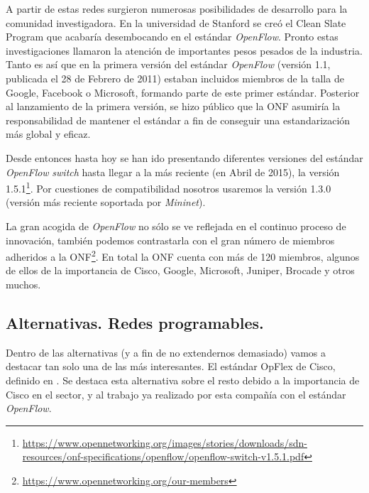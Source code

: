 \documentclass[a4paper,11pt]{book}
\begin{document}
A partir de estas redes surgieron numerosas posibilidades de desarrollo para la comunidad investigadora. En la universidad de Stanford se creó el Clean Slate Program que acabaría desembocando en el estándar \emph{OpenFlow}. Pronto estas investigaciones llamaron la atención de importantes pesos pesados de la industria. Tanto es así que en la primera versión del estándar \emph{OpenFlow} (versión 1.1, publicada el 28 de Febrero de 2011) estaban incluidos miembros de la talla de Google, Facebook o Microsoft, formando parte de este primer estándar. Posterior al lanzamiento de la primera versión, se hizo público que la \ac{ONF} asumiría la responsabilidad de mantener el estándar a fin de conseguir una estandarización más global y eficaz.

Desde entonces hasta hoy se han ido presentando diferentes versiones del estándar \emph{OpenFlow} \textit{switch} hasta llegar a la más reciente (en Abril de 2015), la versión 1.5.1\footnote{\url{https://www.opennetworking.org/images/stories/downloads/sdn-resources/onf-specifications/openflow/openflow-switch-v1.5.1.pdf}}. Por cuestiones de compatibilidad nosotros usaremos la versión 1.3.0 (versión más reciente soportada por \emph{Mininet}\cite{mininet}).

La gran acogida de \emph{OpenFlow} no sólo se ve reflejada en el continuo proceso de innovación, también podemos contrastarla con el gran número de miembros adheridos a la \ac{ONF}\footnote{\url{https://www.opennetworking.org/our-members}}. En total la \ac{ONF} cuenta con más de 120 miembros, algunos de ellos de la importancia de Cisco, Google, Microsoft, Juniper, Brocade y otros muchos.

\subsection{Alternativas. Redes programables.}

Dentro de las alternativas (y a fin de no extendernos demasiado) vamos a destacar tan solo una de las más interesantes. El estándar OpFlex de Cisco, definido en \cite{opFlex}. Se destaca esta alternativa sobre el resto debido a la importancia de Cisco en el sector, y al trabajo ya realizado por esta compañía con el estándar \emph{OpenFlow}.
\end{document}
